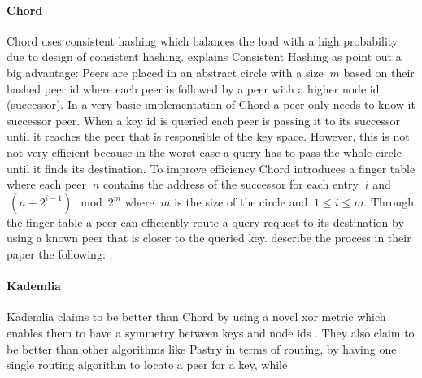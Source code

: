 \paragraph{Chord}
Chord uses consistent hashing which balances the load with a high probability due to design of consistent hashing. \citet{consistentHashing} explains Consistent Hashing as  \citet[\S4.2]{chord} point out a big advantage: 
Peers are placed in an abstract circle with a size $\ m $ based on their hashed peer id where each peer is followed by a peer with a higher node id (successor). In a very basic implementation of Chord a peer only needs to know it successor peer. When a key id is queried each peer is passing it to its successor until it reaches the peer that is responsible of the key space. However, this is not not very efficient because in the worst case a query has to pass the whole circle until it finds its destination. To improve efficiency Chord introduces a finger table where each peer $\ n $ contains the address of the successor for each entry $\ i $ and $\ (n + 2^{i-1}) \mod 2^m $ where $\ m $ is the size of the circle and $\ 1 \leq i \leq m$. Through the finger table a peer can efficiently route a query request to its destination by using a known peer that is closer to the queried key. \citet[\S4.3]{chord} describe the process in their paper the following: .

\paragraph{Kademlia}
Kademlia claims to be better than Chord by using a novel \gls{xor} metric which enables them to have a symmetry between keys and node ids \cite[\S1]{kademlia}. They also claim to be better than other algorithms like Pastry in terms of routing, by having one single routing algorithm to locate a peer for a key, while \cite[\S1]{kademlia}

